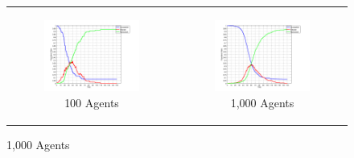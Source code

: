 \begin{figure}
\begin{center}
	\begin{tabular}{c c}
		\begin{subfigure}[b]{0.3\textwidth}
			\centering
			\includegraphics[width=1\textwidth, angle=0]{./../shared/fig/frabs/SIR_100agents_150t_01dt_NOSS_parallel.png}
			\caption{100 Agents}
			\label{fig:sir_abs_approximating_100}
		\end{subfigure}
    	&
		\begin{subfigure}[b]{0.3\textwidth}
			\centering
			\includegraphics[width=1\textwidth, angle=0]{./../shared/fig/frabs/SIR_1000agents_150t_01dt_NOSS_parallel.png}
			\caption{1,000 Agents}
			\label{fig:sir_abs_approximating_1000}
		\end{subfigure}
    	

\end{tabular}
\end{center}
\end{figure}
